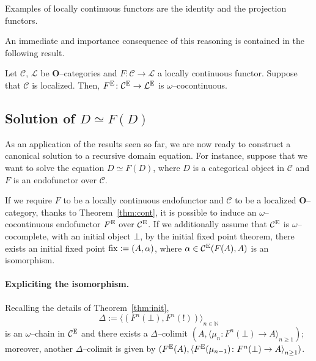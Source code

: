 Examples of locally continuous functors are the identity and the projection functors.

An immediate and importance consequence of this reasoning is contained in the following result.

\begin{thm}\label{thm:cont}
  Let \(\mathcal{C}\), \(\mathcal{L}\) be \(\mathbf{O}\)--categories and \(F \colon \mathcal{C} \to \mathcal{L}\) a locally continuous functor.
  Suppose that \(\mathcal{C}\) is localized.
  Then, \(F^\textup{E} \colon \mathcal{C}^\textup{E} \to \mathcal{L}^\textup{E}\) is \(\omega\)--cocontinuous. %
\end{thm}

\subsection{Solution of \(D \simeq F(D)\)}

As an application of the results seen so far, we are now ready to construct a canonical solution to a recursive domain equation.
For instance, suppose that we want to solve the equation \(D \simeq F(D)\), where \(D\) is a categorical object in \(\mathcal{C}\) and \(F\) is an endofunctor over \(\mathcal{C}\).

If we require \(F\) to be a locally continuous endofunctor and \(\mathcal{C}\) to be a localized \(\mathbf{O}\)--category, thanks to Theorem~\ref{thm:cont}, it is possible to induce an \(\omega\)--cocontinuous endofunctor \(F^\textup{E}\) over \(\mathcal{C}^\textup{E}\). %
If we additionally assume that \(\mathcal{C}^\textup{E}\) is \(\omega\)--cocomplete, with an initial object \(\bot\), by the initial fixed point theorem, there exists an initial fixed point \(\operatorname{fix} := (A,\alpha)\), where \(\alpha \in \mathcal{C}^\textup{E}(F(A), A)\) is an isomorphism. %

\paragraph{Expliciting the isomorphism.}
Recalling the details of Theorem~\ref{thm:init},
\begin{equation*}
  \Delta := {\langle(F^n(\bot),F^n(!))\rangle}_{n \in \mathbb{N}}
\end{equation*}
is an \(\omega\)--chain in \(\mathcal{C}^\textup{E}\) and there exists a \(\Delta\)--colimit \((A, {\langle \mu_n \colon F^n(\bot) \to A \rangle}_{n \ge 1})\); moreover, another \(\Delta\)--colimit is given by \((F^\textup{E}(A), {\langle F^\textup{E}(\mu_{n-1}) \colon F^n(\bot) \to A \rangle}_{n \ge 1})\). %

